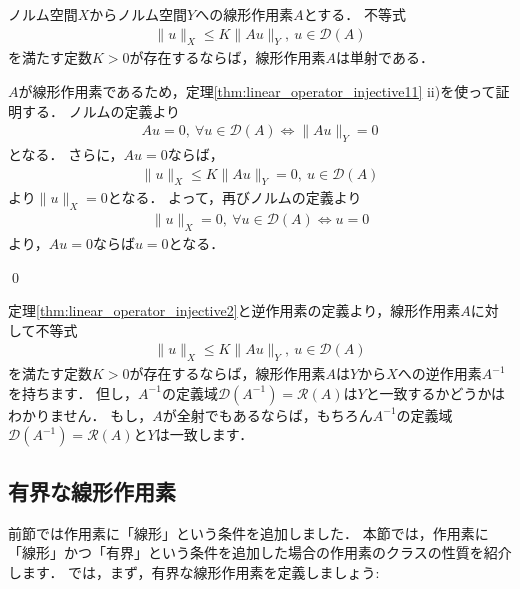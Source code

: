 \begin{Thm}[線形作用素に対する単射性(2)]\label{thm:linear_operator_injective2}
	ノルム空間$X$からノルム空間$Y$への線形作用素$A$とする．
	不等式
	\begin{align*}
	 \| u \|_{X} \le K \| A u \|_{Y}, ~ u \in {\mathcal D}(A)
	\end{align*}
	を満たす定数$K > 0$が存在するならば，線形作用素$A$は単射である．
\end{Thm}

\begin{Proof}
	$A$が線形作用素であるため，定理\ref{thm:linear_operator_injective11} ii)を使って証明する．
	ノルムの定義より
	\begin{align*}
	 A u = 0, ~ \forall u \in {\mathcal D}(A) \Leftrightarrow \| A u \|_{Y} = 0
	\end{align*}
	となる．
	さらに，$A u = 0$ならば，
	\begin{align*}
	 \| u \|_{X} \le K \| A u \|_{Y} = 0, ~ u \in {\mathcal D}(A)
	\end{align*}
	より$\| u \|_{X} = 0$となる．
	よって，再びノルムの定義より
	\begin{align*}
	 \| u \|_{X} = 0, ~ \forall u \in {\mathcal D}(A) \Leftrightarrow u  = 0
	\end{align*}
	より，$A u = 0$ならば$u = 0$となる．

\qed
\end{Proof}

定理\ref{thm:linear_operator_injective2}と逆作用素の定義より，線形作用素$A$に対して不等式
\begin{align*}
 \| u \|_{X} \le K \| A u \|_{Y}, ~ u \in {\mathcal D}(A)
\end{align*}
を満たす定数$K > 0$が存在するならば，線形作用素$A$は$Y$から$X$への逆作用素$A^{-1}$を持ちます．
但し，$A^{-1}$の定義域${\mathcal D}(A^{-1}) = {\mathcal R}(A)$は$Y$と一致するかどうかはわかりません．
もし，$A$が全射でもあるならば，もちろん$A^{-1}$の定義域${\mathcal D}(A^{-1}) = {\mathcal R}(A)$と$Y$は一致します．




\subsection{有界な線形作用素}
前節では作用素に「線形」という条件を追加しました．
本節では，作用素に「線形」かつ「有界」という条件を追加した場合の作用素のクラスの性質を紹介します．
では，まず，有界な線形作用素を定義しましょう:

